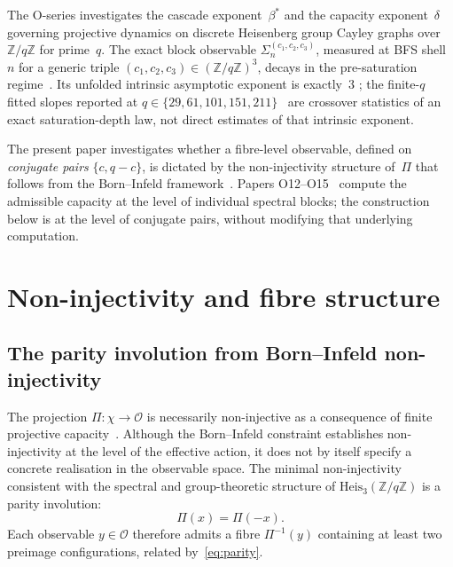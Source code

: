 \documentclass[11pt,a4paper]{article}
\theoremstyle{definition}
\newcommand{\bstar}{\beta^*}
\newcommand{\Heis}{\mathrm{Heis}_3}
\newcommand{\ZqZ}{\mathbb{Z}/q\mathbb{Z}}
\begin{document}
  The O-series investigates the cascade exponent~$\bstar$ and the
  capacity exponent~$\delta$ governing projective dynamics on discrete
  Heisenberg group Cayley graphs over $\ZqZ$ for prime~$q$.
  The exact block observable $\Sigma_n^{(c_1,c_2,c_3)}$, measured at BFS
  shell~$n$ for a generic triple $(c_1,c_2,c_3) \in (\ZqZ)^3$, decays in
  the pre-saturation regime~\cite{Beau2026a16,Beau2026a17}.
  Its unfolded intrinsic asymptotic exponent is exactly~$3$
  \cite{Beau2026a16}; the finite-$q$ fitted slopes reported at
  $q \in \{29,61,101,151,211\}$~\cite{Beau2026a16,Beau2026a17} are
  crossover statistics of an exact saturation-depth law, not direct
  estimates of that intrinsic exponent.

  The present paper investigates whether a fibre-level observable,
  defined on \emph{conjugate pairs} $\{c,q-c\}$, is dictated by the
  non-injectivity structure of~$\Pi$ that follows from the
  Born--Infeld framework~\cite{Beau2026a2}.
  Papers O12--O15~\cite{Beau2026a16,Beau2026a17,Beau2026a18,Beau2026a19}
  compute the admissible capacity at the level of individual spectral
  blocks; the construction below is at the level of conjugate pairs,
  without modifying that underlying computation.

  \section{Non-injectivity and fibre structure}
  \label{sec:fibre_structure}

  \subsection{The parity involution from Born--Infeld non-injectivity}

    The projection $\Pi : \chi \to \mathcal{O}$ is necessarily non-injective
    as a consequence of finite projective capacity~\cite{Beau2026a2}.
    Although the Born--Infeld constraint establishes non-injectivity at the
    level of the effective action, it does not by itself specify a
    concrete realisation in the observable space.
    The minimal non-injectivity consistent with the spectral and group-theoretic
    structure of $\Heis(\ZqZ)$ is a parity involution:
    \begin{equation}
      \Pi(x) = \Pi(-x).
      \label{eq:parity}
    \end{equation}
    Each observable $y \in \mathcal{O}$ therefore admits a fibre
    $\Pi^{-1}(y)$ containing at least two preimage configurations,
    related by~\eqref{eq:parity}.
\end{document}
